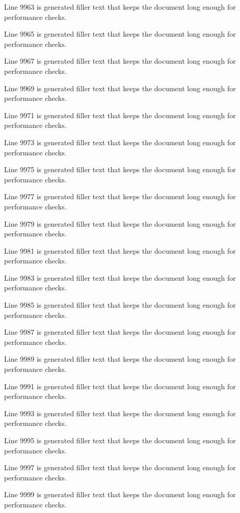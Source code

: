 Line 9963 is generated filler text that keeps the document long enough for performance checks.

Line 9965 is generated filler text that keeps the document long enough for performance checks.

Line 9967 is generated filler text that keeps the document long enough for performance checks.

Line 9969 is generated filler text that keeps the document long enough for performance checks.

Line 9971 is generated filler text that keeps the document long enough for performance checks.

Line 9973 is generated filler text that keeps the document long enough for performance checks.

Line 9975 is generated filler text that keeps the document long enough for performance checks.

Line 9977 is generated filler text that keeps the document long enough for performance checks.

Line 9979 is generated filler text that keeps the document long enough for performance checks.

Line 9981 is generated filler text that keeps the document long enough for performance checks.

Line 9983 is generated filler text that keeps the document long enough for performance checks.

Line 9985 is generated filler text that keeps the document long enough for performance checks.

Line 9987 is generated filler text that keeps the document long enough for performance checks.

Line 9989 is generated filler text that keeps the document long enough for performance checks.

Line 9991 is generated filler text that keeps the document long enough for performance checks.

Line 9993 is generated filler text that keeps the document long enough for performance checks.

Line 9995 is generated filler text that keeps the document long enough for performance checks.

Line 9997 is generated filler text that keeps the document long enough for performance checks.

Line 9999 is generated filler text that keeps the document long enough for performance checks.

